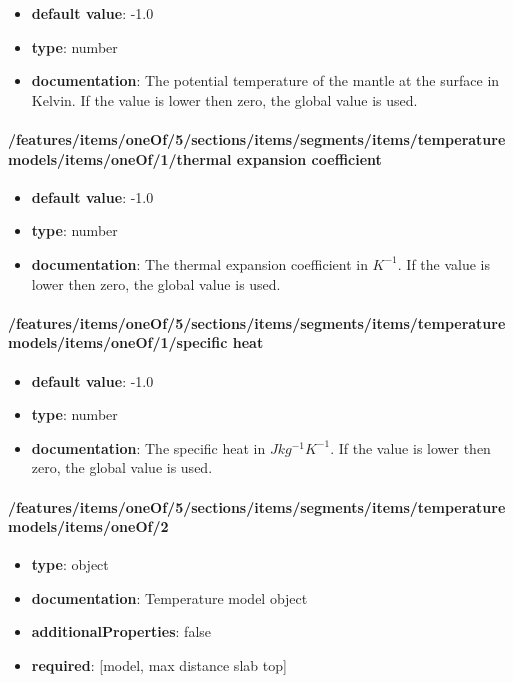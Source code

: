 \begin{itemize}\item {\bf default value}: -1.0
\item {\bf type}: number
\item {\bf documentation}: The potential temperature of the mantle at the surface in Kelvin. If the value is lower then zero, the global value is used.
\end{itemize}\paragraph{/features/items/oneOf/5/sections/items/segments/items/temperature models/items/oneOf/1/thermal expansion coefficient}
\begin{itemize}\item {\bf default value}: -1.0
\item {\bf type}: number
\item {\bf documentation}: The thermal expansion coefficient in $K^{-1}$. If the value is lower then zero, the global value is used.
\end{itemize}\paragraph{/features/items/oneOf/5/sections/items/segments/items/temperature models/items/oneOf/1/specific heat}
\begin{itemize}\item {\bf default value}: -1.0
\item {\bf type}: number
\item {\bf documentation}: The specific heat in $J kg^{-1} K^{-1}$. If the value is lower then zero, the global value is used.
\end{itemize}\paragraph{/features/items/oneOf/5/sections/items/segments/items/temperature models/items/oneOf/2}
\begin{itemize}\item {\bf type}: object
\item {\bf documentation}: Temperature model object
\item {\bf additionalProperties}: false
\item {\bf required}: [model, max distance slab top]\end{itemize}
